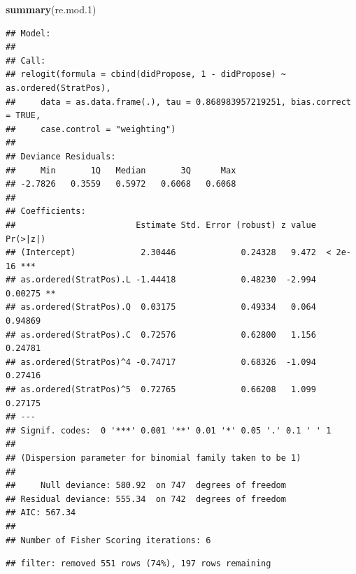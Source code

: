\documentclass[
]{article}
\newenvironment{Shaded}{\begin{snugshade}}{\end{snugshade}}
\newcommand{\FloatTok}[1]{\textcolor[rgb]{0.00,0.00,0.81}{#1}}
\newcommand{\KeywordTok}[1]{\textcolor[rgb]{0.13,0.29,0.53}{\textbf{#1}}}
\newcommand{\NormalTok}[1]{#1}
\newcommand{\OperatorTok}[1]{\textcolor[rgb]{0.81,0.36,0.00}{\textbf{#1}}}
\newcommand{\StringTok}[1]{\textcolor[rgb]{0.31,0.60,0.02}{#1}}
\begin{document}
\begin{Shaded}
\begin{Highlighting}[]
\KeywordTok{summary}\NormalTok{(re.mod}\FloatTok{.1}\NormalTok{)}
\end{Highlighting}
\end{Shaded}

\begin{verbatim}
## Model: 
## 
## Call:
## relogit(formula = cbind(didPropose, 1 - didPropose) ~ as.ordered(StratPos), 
##     data = as.data.frame(.), tau = 0.868983957219251, bias.correct = TRUE, 
##     case.control = "weighting")
## 
## Deviance Residuals: 
##     Min       1Q   Median       3Q      Max  
## -2.7826   0.3559   0.5972   0.6068   0.6068  
## 
## Coefficients:
##                        Estimate Std. Error (robust) z value Pr(>|z|)    
## (Intercept)             2.30446             0.24328   9.472  < 2e-16 ***
## as.ordered(StratPos).L -1.44418             0.48230  -2.994  0.00275 ** 
## as.ordered(StratPos).Q  0.03175             0.49334   0.064  0.94869    
## as.ordered(StratPos).C  0.72576             0.62800   1.156  0.24781    
## as.ordered(StratPos)^4 -0.74717             0.68326  -1.094  0.27416    
## as.ordered(StratPos)^5  0.72765             0.66208   1.099  0.27175    
## ---
## Signif. codes:  0 '***' 0.001 '**' 0.01 '*' 0.05 '.' 0.1 ' ' 1
## 
## (Dispersion parameter for binomial family taken to be 1)
## 
##     Null deviance: 580.92  on 747  degrees of freedom
## Residual deviance: 555.34  on 742  degrees of freedom
## AIC: 567.34
## 
## Number of Fisher Scoring iterations: 6
\end{verbatim}

\begin{Shaded}
\end{Shaded}

\begin{verbatim}
## filter: removed 551 rows (74%), 197 rows remaining
\end{verbatim}

\begin{Shaded}
\end{Shaded}
\end{document}
